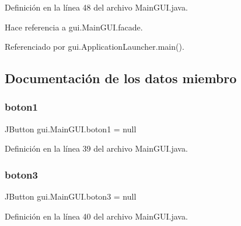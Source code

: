Definición en la línea 48 del archivo Main\+G\+U\+I.\+java.


\begin{DoxyCode}{0}

\end{DoxyCode}


Hace referencia a gui.\+Main\+G\+U\+I.\+facade.



Referenciado por gui.\+Application\+Launcher.\+main().



\subsection{Documentación de los datos miembro}
\mbox{\label{classgui_1_1_main_g_u_i_ad619899aca3a67d7a82028de85ddfbcd}} 
\subsubsection{\texorpdfstring{boton1}{boton1}}
{\footnotesize\ttfamily J\+Button gui.\+Main\+G\+U\+I.\+boton1 = null\hspace{0.3cm}{\ttfamily [private]}}



Definición en la línea 39 del archivo Main\+G\+U\+I.\+java.

\mbox{\label{classgui_1_1_main_g_u_i_a4ea50bfcac59d520e64e3fcfdec1457c}} 
\subsubsection{\texorpdfstring{boton3}{boton3}}
{\footnotesize\ttfamily J\+Button gui.\+Main\+G\+U\+I.\+boton3 = null\hspace{0.3cm}{\ttfamily [private]}}



Definición en la línea 40 del archivo Main\+G\+U\+I.\+java.



